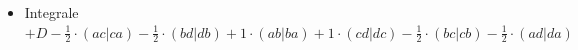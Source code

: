 \documentclass[12pt,a4paper]{article}
\newcommand{\h}[2]{\color{#1} #2 \color{black} }
\newcommand{\equalInM}[1]{\h{blue}{#1}} %
\newcommand{\equalInTableau}[1]{\h{magenta}{#1}} %
\begin{document}
\begin{itemize}
\begin{itemize}
\begin{itemize}
$= \equalInM{1234} \equalInTableau{- 3214} \equalInTableau{- 1432} \equalInM{+ 3412}
\equalInTableau{+ 2134} - 2314 - 4132 \equalInTableau{+ 4312} $\\
$ \equalInTableau{+ 1243} - 3241 - 1423 \equalInTableau{+ 3421}
\equalInM{+ 2143} \equalInTableau{- 2341} \equalInTableau{- 4123} \equalInM{+ 4321} $  \\
bzw. 
$ abcd - cbad - adcb + cdab + bacd - cabd - bdca + cdba$\\
$+abdc - dbac - acdb + dcab + badc - dabc - bcda + dcba$
\item Integrale \\
$ + D - \frac{1}{2} \cdot (ac|ca) - \frac{1}{2} \cdot (bd|db) + 1 \cdot (ab|ba) + 1 \cdot (cd|dc) - \frac{1}{2} \cdot (bc|cb) - \frac{1}{2} \cdot (ad|da) $ 
\end{itemize}
\end{itemize}



\end{itemize}
\end{document}
